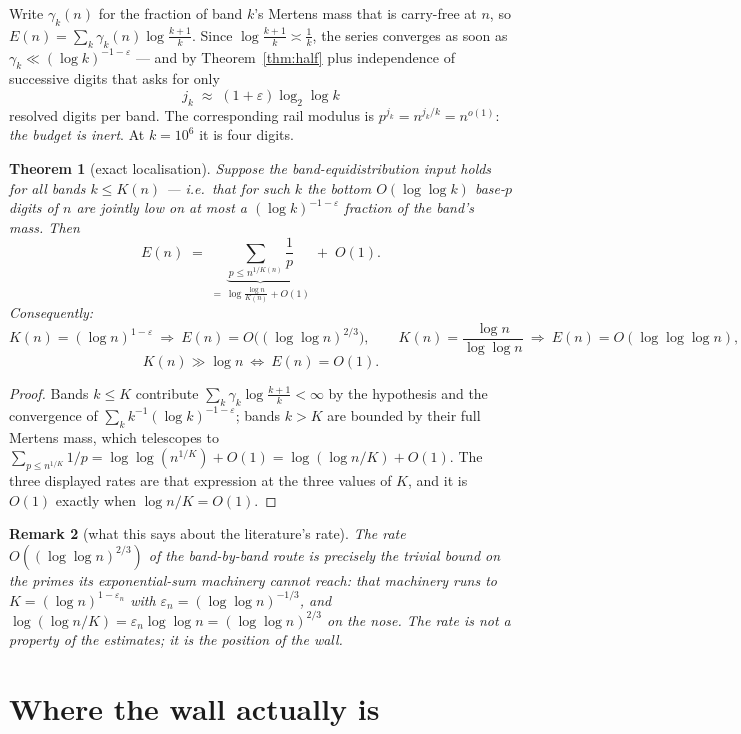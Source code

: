 \documentclass[11pt]{article}
\newtheorem{theorem}{Theorem}
\newtheorem{remark}[theorem]{Remark}
\begin{document}
Write $\gamma_k(n)$ for the fraction of band $k$'s Mertens mass that is
carry-free at $n$, so $E(n)=\sum_k\gamma_k(n)\log\frac{k+1}{k}$.  Since
$\log\frac{k+1}{k}\asymp\frac1k$, the series converges as soon as
$\gamma_k\ll(\log k)^{-1-\varepsilon}$ --- and by
Theorem~\ref{thm:half} plus independence of successive digits that asks for only
\[
  j_k\;\approx\;(1+\varepsilon)\log_2\log k
\]
resolved digits per band.  The corresponding rail modulus is
$p^{j_k}=n^{j_k/k}=n^{o(1)}$: \emph{the budget is inert}.  At $k=10^6$ it is
four digits.

\begin{theorem}[exact localisation]\label{thm:local}
Suppose the band-equidistribution input holds for all bands $k\le K(n)$ ---
i.e.\ that for such $k$ the bottom $O(\log\log k)$ base-$p$ digits of $n$ are
jointly low on at most a $(\log k)^{-1-\varepsilon}$ fraction of the band's
mass.  Then
\[
  E(n)\;=\;\underbrace{\sum_{p\le n^{1/K(n)}}\frac1p}_{\textstyle=\ \log\frac{\log n}{K(n)}+O(1)}
  \;+\;O(1).
\]
Consequently:
\[
  K(n)=(\log n)^{1-\varepsilon}\ \Rightarrow\ E(n)=O\bigl((\log\log n)^{2/3}\bigr),
  \qquad
  K(n)=\frac{\log n}{\log\log n}\ \Rightarrow\ E(n)=O(\log\log\log n),
\]
\[
  \boxed{\ K(n)\gg\log n\ \Longleftrightarrow\ E(n)=O(1).\ }
\]
\end{theorem}

\begin{proof}
Bands $k\le K$ contribute $\sum_k\gamma_k\log\frac{k+1}{k}<\infty$ by the
hypothesis and the convergence of $\sum_k k^{-1}(\log k)^{-1-\varepsilon}$;
bands $k>K$ are bounded by their full Mertens mass, which telescopes to
$\sum_{p\le n^{1/K}}1/p=\log\log(n^{1/K})+O(1)=\log(\log n/K)+O(1)$.  The three
displayed rates are that expression at the three values of $K$, and it is
$O(1)$ exactly when $\log n/K=O(1)$.
\end{proof}

\begin{remark}[what this says about the literature's rate]
The rate $O((\log\log n)^{2/3})$ of the band-by-band route is \emph{precisely}
the trivial bound on the primes its exponential-sum machinery cannot reach:
that machinery runs to $K=(\log n)^{1-\varepsilon_n}$ with
$\varepsilon_n=(\log\log n)^{-1/3}$, and
$\log(\log n/K)=\varepsilon_n\log\log n=(\log\log n)^{2/3}$ on the nose.  The
rate is not a property of the estimates; it is the position of the wall.
\end{remark}

\section{Where the wall actually is}
\end{document}
